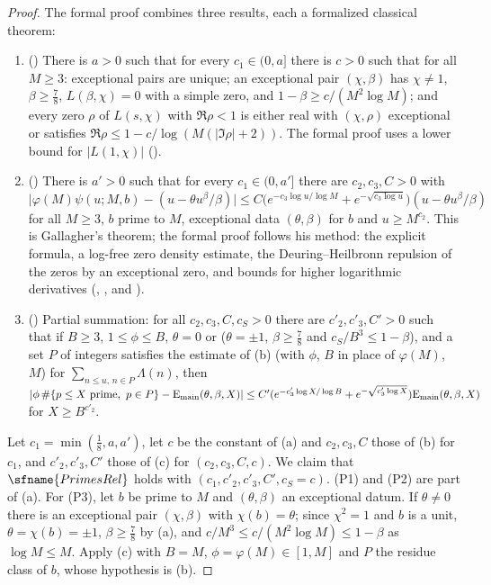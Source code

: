 \begin{proof}
The formal proof combines three results, each a formalized classical theorem:
\begin{enumerate}[label=(\alph*)]
\item () There is $a>0$ such that for every
$c_1\in(0,a]$ there is $c>0$ such that for all $M\ge3$: exceptional pairs are unique; an exceptional pair $(\chi,\beta)$ has $\chi\ne1$,
$\beta\ge\frac78$, $L(\beta,\chi)=0$ with a simple zero, and $1-\beta\ge c/(M^2\log M)$; and every zero $\rho$ of $L(s,\chi)$ with
$\Re\rho<1$ is either real with $(\chi,\rho)$ exceptional or satisfies $\Re\rho\le1-c/\log(M(|\Im\rho|+2))$. The formal proof uses
a lower bound for $|L(1,\chi)|$ ().
\item () There is $a'>0$ such that for every $c_1\in(0,a']$ there
are $c_2,c_3,C>0$ with
$\bigl|\varphi(M)\psi(u;M,b)-(u-\theta u^\beta/\beta)\bigr|\le C\bigl(e^{-c_3\log u/\log M}+e^{-\sqrt{c_3\log u}}\bigr)(u-\theta u^\beta/\beta)$
for all $M\ge3$, $b$ prime to $M$, exceptional data $(\theta,\beta)$ for $b$ and $u\ge M^{c_2}$. This is Gallagher's theorem; the formal
proof follows his method: the explicit formula, a log-free zero density estimate, the Deuring--Heilbronn repulsion of the zeros
by an exceptional zero, and bounds for higher logarithmic derivatives
(, , and ).
\item () Partial summation: for all $c_2,c_3,C,c_S>0$
there are $c'_2,c'_3,C'>0$ such that if $B\ge3$, $1\le\phi\le B$, $\theta=0$ or ($\theta=\pm1$, $\beta\ge\frac78$ and $c_S/B^3\le1-\beta$),
and a set $P$ of integers satisfies the estimate of (b) (with $\phi$, $B$ in place of $\varphi(M)$, $M$) for $\sum_{n\le u,\,n\in P}\Lambda(n)$,
then $|\phi\,\#\{p\le X\ \text{prime},\ p\in P\}-\mathrm{E}_{\mathrm{main}}(\theta,\beta,X)|\le C'(e^{-c'_3\log X/\log B}+e^{-\sqrt{c'_3\log X}})\mathrm{E}_{\mathrm{main}}(\theta,\beta,X)$
for $X\ge B^{c'_2}$.
\end{enumerate}
Let $c_1=\min(\frac18,a,a')$, let $c$ be the constant of (a) and $c_2,c_3,C$ those of (b) for $c_1$, and $c'_2,c'_3,C'$ those of (c) for
$(c_2,c_3,C,c)$. We claim that $\sfname{PrimesRel}$ holds with $(c_1,c'_2,c'_3,C',c_S=c)$. (P1) and (P2) are part of (a). For (P3), let
$b$ be prime to $M$ and $(\theta,\beta)$ an exceptional datum. If $\theta\ne0$ there is an exceptional pair $(\chi,\beta)$ with
$\chi(b)=\theta$; since $\chi^2=1$ and $b$ is a unit, $\theta=\chi(b)=\pm1$, $\beta\ge\frac78$ by
(a), and $c/M^3\le c/(M^2\log M)\le1-\beta$ as $\log M\le M$. Apply (c) with $B=M$, $\phi=\varphi(M)\in[1,M]$ and $P$ the residue
class of $b$, whose hypothesis is (b).
\end{proof}

